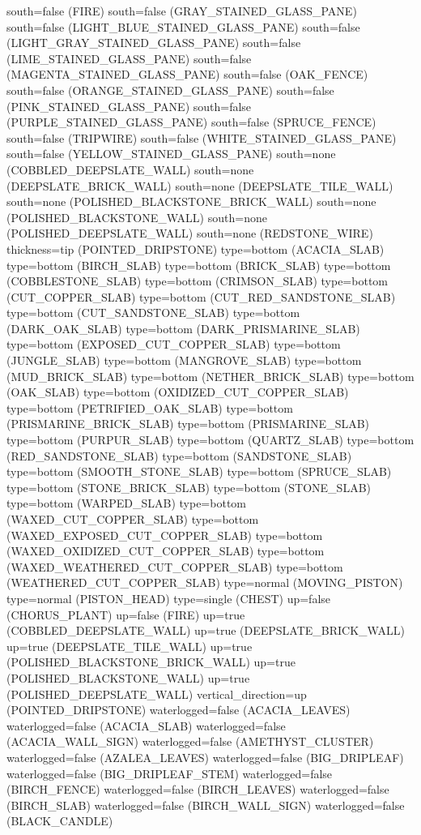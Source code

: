 \documentclass[11pt]{article}
\begin{document}
south=false (FIRE)
south=false (GRAY_STAINED_GLASS_PANE)
south=false (LIGHT_BLUE_STAINED_GLASS_PANE)
south=false (LIGHT_GRAY_STAINED_GLASS_PANE)
south=false (LIME_STAINED_GLASS_PANE)
south=false (MAGENTA_STAINED_GLASS_PANE)
south=false (OAK_FENCE)
south=false (ORANGE_STAINED_GLASS_PANE)
south=false (PINK_STAINED_GLASS_PANE)
south=false (PURPLE_STAINED_GLASS_PANE)
south=false (SPRUCE_FENCE)
south=false (TRIPWIRE)
south=false (WHITE_STAINED_GLASS_PANE)
south=false (YELLOW_STAINED_GLASS_PANE)
south=none (COBBLED_DEEPSLATE_WALL)
south=none (DEEPSLATE_BRICK_WALL)
south=none (DEEPSLATE_TILE_WALL)
south=none (POLISHED_BLACKSTONE_BRICK_WALL)
south=none (POLISHED_BLACKSTONE_WALL)
south=none (POLISHED_DEEPSLATE_WALL)
south=none (REDSTONE_WIRE)
thickness=tip (POINTED_DRIPSTONE)
type=bottom (ACACIA_SLAB)
type=bottom (BIRCH_SLAB)
type=bottom (BRICK_SLAB)
type=bottom (COBBLESTONE_SLAB)
type=bottom (CRIMSON_SLAB)
type=bottom (CUT_COPPER_SLAB)
type=bottom (CUT_RED_SANDSTONE_SLAB)
type=bottom (CUT_SANDSTONE_SLAB)
type=bottom (DARK_OAK_SLAB)
type=bottom (DARK_PRISMARINE_SLAB)
type=bottom (EXPOSED_CUT_COPPER_SLAB)
type=bottom (JUNGLE_SLAB)
type=bottom (MANGROVE_SLAB)
type=bottom (MUD_BRICK_SLAB)
type=bottom (NETHER_BRICK_SLAB)
type=bottom (OAK_SLAB)
type=bottom (OXIDIZED_CUT_COPPER_SLAB)
type=bottom (PETRIFIED_OAK_SLAB)
type=bottom (PRISMARINE_BRICK_SLAB)
type=bottom (PRISMARINE_SLAB)
type=bottom (PURPUR_SLAB)
type=bottom (QUARTZ_SLAB)
type=bottom (RED_SANDSTONE_SLAB)
type=bottom (SANDSTONE_SLAB)
type=bottom (SMOOTH_STONE_SLAB)
type=bottom (SPRUCE_SLAB)
type=bottom (STONE_BRICK_SLAB)
type=bottom (STONE_SLAB)
type=bottom (WARPED_SLAB)
type=bottom (WAXED_CUT_COPPER_SLAB)
type=bottom (WAXED_EXPOSED_CUT_COPPER_SLAB)
type=bottom (WAXED_OXIDIZED_CUT_COPPER_SLAB)
type=bottom (WAXED_WEATHERED_CUT_COPPER_SLAB)
type=bottom (WEATHERED_CUT_COPPER_SLAB)
type=normal (MOVING_PISTON)
type=normal (PISTON_HEAD)
type=single (CHEST)
up=false (CHORUS_PLANT)
up=false (FIRE)
up=true (COBBLED_DEEPSLATE_WALL)
up=true (DEEPSLATE_BRICK_WALL)
up=true (DEEPSLATE_TILE_WALL)
up=true (POLISHED_BLACKSTONE_BRICK_WALL)
up=true (POLISHED_BLACKSTONE_WALL)
up=true (POLISHED_DEEPSLATE_WALL)
vertical_direction=up (POINTED_DRIPSTONE)
waterlogged=false (ACACIA_LEAVES)
waterlogged=false (ACACIA_SLAB)
waterlogged=false (ACACIA_WALL_SIGN)
waterlogged=false (AMETHYST_CLUSTER)
waterlogged=false (AZALEA_LEAVES)
waterlogged=false (BIG_DRIPLEAF)
waterlogged=false (BIG_DRIPLEAF_STEM)
waterlogged=false (BIRCH_FENCE)
waterlogged=false (BIRCH_LEAVES)
waterlogged=false (BIRCH_SLAB)
waterlogged=false (BIRCH_WALL_SIGN)
waterlogged=false (BLACK_CANDLE)
\end{document}
